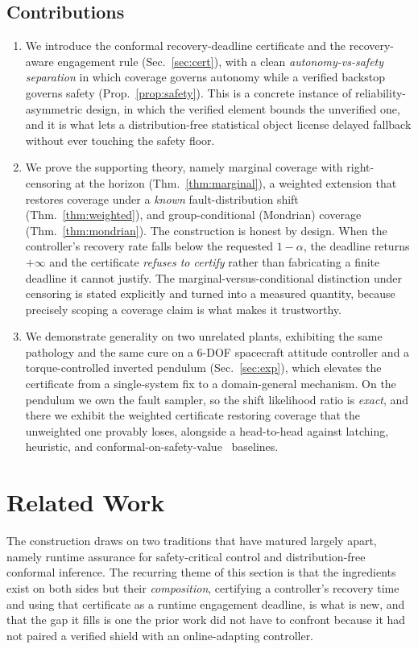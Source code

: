 \documentclass[11pt]{article}
\theoremstyle{plain}
\theoremstyle{definition}
\begin{document}
\subsection{Contributions}
\begin{enumerate}[leftmargin=1.5em,itemsep=2pt]
\item We introduce the conformal recovery-deadline certificate and the recovery-aware
engagement rule (Sec.~\ref{sec:cert}), with a clean \emph{autonomy-vs-safety separation} in
which coverage governs autonomy while a verified backstop governs safety
(Prop.~\ref{prop:safety}). This is a concrete instance of reliability-asymmetric design, in
which the verified element bounds the unverified one, and it is what lets a distribution-free
statistical object license delayed fallback without ever touching the safety floor.
\item We prove the supporting theory, namely marginal coverage with right-censoring at the
horizon (Thm.~\ref{thm:marginal}), a weighted extension that restores coverage under a
\emph{known} fault-distribution shift (Thm.~\ref{thm:weighted}), and group-conditional
(Mondrian) coverage (Thm.~\ref{thm:mondrian}). The construction is honest by design. When the
controller's recovery rate falls below the requested $1-\alpha$, the deadline returns
$+\infty$ and the certificate \emph{refuses to certify} rather than fabricating a finite
deadline it cannot justify. The marginal-versus-conditional distinction under censoring is
stated explicitly and turned into a measured quantity, because precisely scoping a coverage
claim is what makes it trustworthy.
\item We demonstrate generality on two unrelated plants, exhibiting the same pathology and
the same cure on a 6-DOF spacecraft attitude controller and a torque-controlled inverted
pendulum (Sec.~\ref{sec:exp}), which elevates the certificate from a single-system fix to a
domain-general mechanism. On the pendulum we own the fault sampler, so the shift likelihood
ratio is \emph{exact}, and there we exhibit the weighted certificate restoring coverage that
the unweighted one provably loses, alongside a head-to-head against latching, heuristic, and
conformal-on-safety-value~\cite{Tabbara2025} baselines.
\end{enumerate}

\section{Related Work}
\label{sec:related}
The construction draws on two traditions that have matured largely apart, namely runtime
assurance for safety-critical control and distribution-free conformal inference. The
recurring theme of this section is that the ingredients exist on both sides but their
\emph{composition}, certifying a controller's recovery time and using that certificate as a
runtime engagement deadline, is what is new, and that the gap it fills is one the prior work
did not have to confront because it had not paired a verified shield with an online-adapting
controller.
\end{document}
